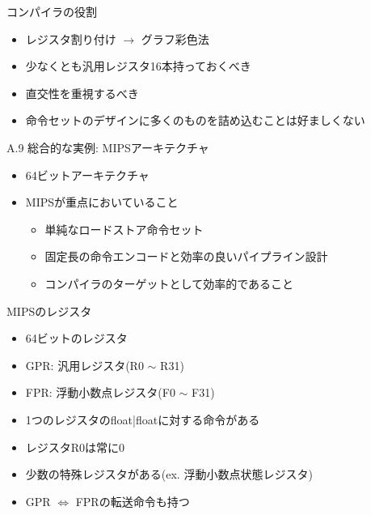 \documentclass[dvipdfmx]{beamer}
\begin{document}
	\begin{frame}{コンパイラの役割}
		\begin{itemize}
			\item レジスタ割り付け $\to$ グラフ彩色法
			\item 少なくとも汎用レジスタ16本持っておくべき
			\item 直交性を重視するべき
			\item 命令セットのデザインに多くのものを詰め込むことは好ましくない
		\end{itemize}
	\end{frame}

	\begin{frame}{A.9 総合的な実例: MIPSアーキテクチャ}
		\begin{itemize}
			\item 64ビットアーキテクチャ
			\item MIPSが重点においていること
				\begin{itemize}
					\item 単純なロードストア命令セット
					\item 固定長の命令エンコードと効率の良いパイプライン設計
					\item コンパイラのターゲットとして効率的であること
				\end{itemize}
		\end{itemize}
	\end{frame}

	\begin{frame}{MIPSのレジスタ}
		\begin{itemize}
			\item 64ビットのレジスタ
			\item GPR: 汎用レジスタ(R0 $\sim$ R31)
			\item FPR: 浮動小数点レジスタ(F0 $\sim$ F31)
			\item 1つのレジスタのfloat|floatに対する命令がある
			\item レジスタR0は常に0
			\item 少数の特殊レジスタがある(ex. 浮動小数点状態レジスタ)
			\item GPR $\Leftrightarrow$ FPRの転送命令も持つ
		\end{itemize}
	\end{frame}
\end{document}
